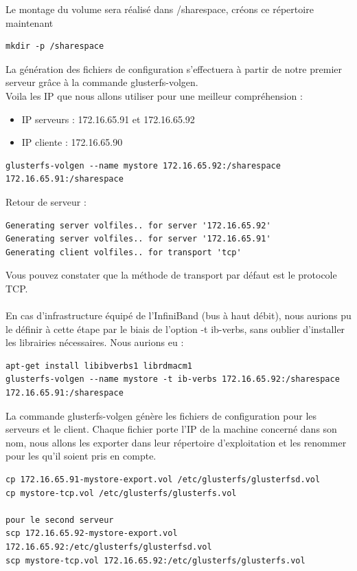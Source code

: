 \documentclass[12pt]{report}
\begin{document}
Le montage du volume sera réalisé dans /sharespace, créons ce répertoire maintenant\\
\begin{lstlisting}
mkdir -p /sharespace
	  \end{lstlisting}
La génération des fichiers de configuration s'effectuera à partir de notre premier serveur grâce à la commande glusterfs-volgen.\\
Voila les IP que nous allons utiliser pour une meilleur compréhension :
	\begin{itemize}
		\item IP serveurs : 172.16.65.91 et 172.16.65.92
		\item IP cliente :  172.16.65.90\\
	\end{itemize}
\begin{lstlisting}
glusterfs-volgen --name mystore 172.16.65.92:/sharespace 172.16.65.91:/sharespace
\end{lstlisting}
Retour de serveur :
\begin{lstlisting}
Generating server volfiles.. for server '172.16.65.92'
Generating server volfiles.. for server '172.16.65.91'
Generating client volfiles.. for transport 'tcp'
	  \end{lstlisting}
Vous pouvez constater que la méthode de transport par défaut est le protocole TCP.\\\\
En cas d'infrastructure équipé de l'InfiniBand (bus à haut débit), nous aurions pu le définir à cette étape par le biais de l'option -t ib-verbs, sans oublier d'installer les librairies nécessaires. Nous aurions eu :\\
\begin{lstlisting}
apt-get install libibverbs1 librdmacm1
glusterfs-volgen --name mystore -t ib-verbs 172.16.65.92:/sharespace 172.16.65.91:/sharespace
	  \end{lstlisting}
La commande glusterfs-volgen génère les fichiers de configuration pour les serveurs et le client. Chaque fichier porte l'IP de la machine concerné dans son nom, nous allons les exporter dans leur répertoire d'exploitation et les renommer pour les qu'il soient pris en compte.
\begin{lstlisting}
cp 172.16.65.91-mystore-export.vol /etc/glusterfs/glusterfsd.vol
cp mystore-tcp.vol /etc/glusterfs/glusterfs.vol

pour le second serveur
scp 172.16.65.92-mystore-export.vol 172.16.65.92:/etc/glusterfs/glusterfsd.vol
scp mystore-tcp.vol 172.16.65.92:/etc/glusterfs/glusterfs.vol
	  \end{lstlisting}
\end{document}

